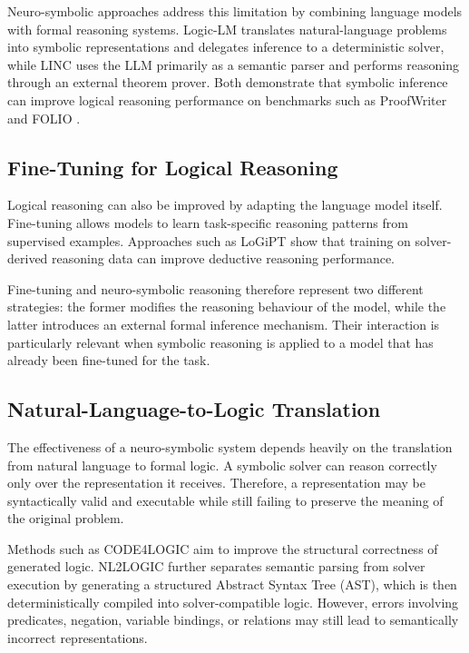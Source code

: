 \documentclass[conference]{IEEEtran}
\begin{document}
Neuro-symbolic approaches address this limitation by combining language models with formal reasoning systems. Logic-LM \cite{logiclm} translates natural-language problems into symbolic representations and delegates inference to a deterministic solver, while LINC \cite{linc} uses the LLM primarily as a semantic parser and performs reasoning through an external theorem prover. Both demonstrate that symbolic inference can improve logical reasoning performance on benchmarks such as ProofWriter \cite{proofwriter} and FOLIO \cite{folio}.

\subsection{Fine-Tuning for Logical Reasoning}

Logical reasoning can also be improved by adapting the language model itself. Fine-tuning allows models to learn task-specific reasoning patterns from supervised examples. Approaches such as LoGiPT \cite{logipt} show that training on solver-derived reasoning data can improve deductive reasoning performance.

Fine-tuning and neuro-symbolic reasoning therefore represent two different strategies: the former modifies the reasoning behaviour of the model, while the latter introduces an external formal inference mechanism. Their interaction is particularly relevant when symbolic reasoning is applied to a model that has already been fine-tuned for the task.

\subsection{Natural-Language-to-Logic Translation}

The effectiveness of a neuro-symbolic system depends heavily on the translation from natural language to formal logic. A symbolic solver can reason correctly only over the representation it receives. Therefore, a representation may be syntactically valid and executable while still failing to preserve the meaning of the original problem.

Methods such as CODE4LOGIC \cite{code4logic} aim to improve the structural correctness of generated logic. NL2LOGIC \cite{nl2logic} further separates semantic parsing from solver execution by generating a structured Abstract Syntax Tree (AST), which is then deterministically compiled into solver-compatible logic. However, errors involving predicates, negation, variable bindings, or relations may still lead to semantically incorrect representations.
\end{document}
